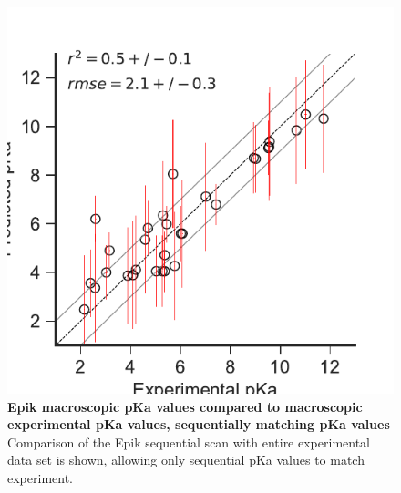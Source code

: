 \documentclass[9pt,lineno,final]{elife}
\begin{document}
\begin{figure}[H]
	\centering
	\includegraphics[scale=1.0]{aligned_pka_epik_typeIII.pdf}	
	\caption{{\bf Epik macroscopic pKa values compared to macroscopic experimental pKa values, sequentially matching pKa values}
		Comparison of the Epik sequential scan with entire experimental data set is shown, allowing only sequential pKa values to match experiment.\label{fig:correlation-sequential}}
\end{figure}
    
\end{document}
